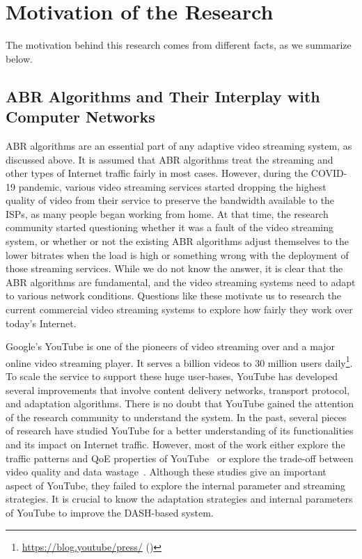 \section{Motivation of the Research}
The motivation behind this research comes from different facts, as we summarize below. 

\subsection{ABR Algorithms and Their Interplay with Computer Networks}
\Ac{ABR} algorithms are an essential part of any adaptive video streaming system, as discussed above. It is assumed that \ac{ABR} algorithms treat the streaming and other types of Internet traffic fairly in most cases. However, during the COVID-19 pandemic, various video streaming services started dropping the highest quality of video from their service to preserve the bandwidth available to the \acp{ISP}, as many people began working from home. At that time, the research community started questioning whether it was a fault of the video streaming system, or whether or not the existing \ac{ABR} algorithms adjust themselves to the lower bitrates when the load is high or something wrong with the deployment of those streaming services. While we do not know the answer, it is clear that the \ac{ABR} algorithms are fundamental, and the video streaming systems need to adapt to various network conditions. Questions like these motivate us to research the current commercial video streaming systems to explore how fairly they work over today's Internet.

Google's YouTube is one of the pioneers of video streaming over  and a major online video streaming player. It serves a billion videos to 30 million users daily\footnote{\url{https://blog.youtube/press/} (\lastaccessedtoday)}. To scale the service to support these huge user-bases, YouTube has developed several improvements that involve content delivery networks, transport protocol, and adaptation algorithms. There is no doubt that YouTube gained the attention of the research community to understand the system. In the past, several pieces of research have studied YouTube for a better understanding of its functionalities and its impact on Internet traffic. However, most of the work either explore the traffic patterns and \ac{QoE} properties of YouTube~\cite{gill2007youtube,krishnappa2013dashing,wamser2016modeling,wamser2015poster,6757893ieeeexp,7129790ieeeexp} or explore the trade-off between video quality and data wastage~\cite{sieber2015cost,seufert2015youtube,sieber2016sacrificing}. Although these studies give an important aspect of YouTube, they failed to explore the internal parameter and streaming strategies. It is crucial to know the adaptation strategies and internal parameters of YouTube to improve the DASH-based system.

